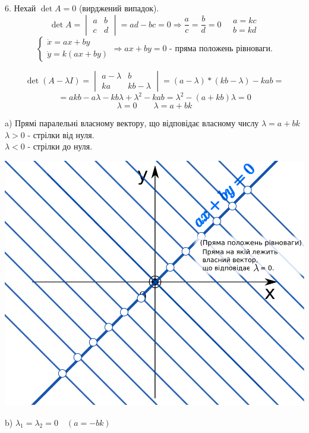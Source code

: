 \documentclass[14pt,a4paper]{scrartcl}
\theoremstyle{definition}
\theoremstyle{definition}
\theoremstyle{definition}
\begin{document}
6. Нехай $ \det A = 0$ (вирджений випадок).\\
$$
\det A  =  \begin{vmatrix}
  a & b\\
  c & d
\end{vmatrix} = ad - bc  = 0 \Rightarrow \frac{a}{c} = \frac{b}{d} = 0 \quad \begin{gathered}
 a = kc\\
 b = kd
\end{gathered}
$$
$$
\begin{cases}
    \dot{x} = ax+ by\\
    \dot{y} = k(ax + by)
\end{cases} \Rightarrow ax + by  = 0 \text{ - пряма положень рівноваги.}
$$

$$
\det ( A - \lambda I) = \begin{vmatrix}
  a - \lambda & b\\
  ka & kb - \lambda
\end{vmatrix} = (a-\lambda)*(kb- \lambda) - kab =
$$
$$
 = akb - a \lambda - kb \lambda +  \lambda^2 - kab = \lambda^2 - (a + kb) \lambda =0
 $$
 $$
 \lambda = 0 \qquad \lambda = a + bk
 $$

 a) Прямі паралельні власному вектору, що відповідає власному числу $\lambda =  a + bk$\\
 $\lambda > 0 $ - стрілки від нуля.\\
 $\lambda < 0 $ - стрілки до нуля.\\

 \begin{center} \includegraphics[scale=0.257]{assets/lectures_recent-058ceaff.png} \end{center}
b) $ \lambda_1 =  \lambda_2 = 0 \quad (a = - bk)$
\end{document}
